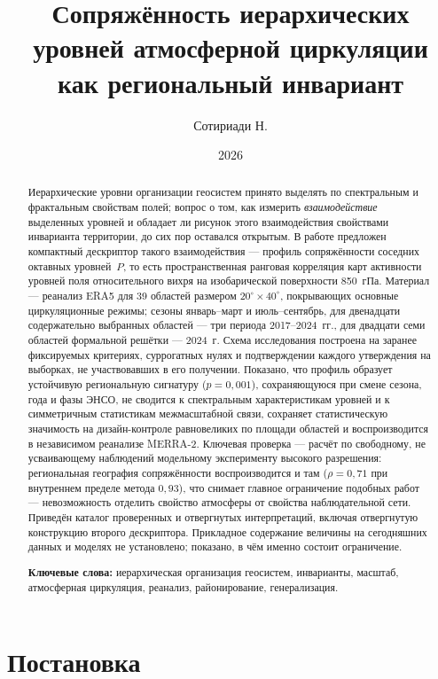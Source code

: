 \documentclass[11pt,a4paper]{article}
\title{Сопряжённость иерархических уровней атмосферной циркуляции\\
как региональный инвариант}
\author{Сотириади Н.}
\date{2026}
\begin{document}
\maketitle

\begin{abstract}
Иерархические уровни организации геосистем принято выделять по спектральным и фрактальным свойствам полей; вопрос о том, как измерить \emph{взаимодействие} выделенных уровней и обладает ли рисунок этого взаимодействия свойствами инварианта территории, до сих пор оставался открытым. В работе предложен компактный дескриптор такого взаимодействия --- профиль сопряжённости соседних октавных уровней~$P$, то есть пространственная ранговая корреляция карт активности уровней поля относительного вихря на изобарической поверхности 850~гПа. Материал --- реанализ ERA5 для 39 областей размером $20^\circ\times40^\circ$, покрывающих основные циркуляционные режимы; сезоны январь--март и июль--сентябрь, для двенадцати содержательно выбранных областей --- три периода 2017--2024~гг., для двадцати семи областей формальной решётки --- 2024~г. Схема исследования построена на заранее фиксируемых критериях, суррогатных нулях и подтверждении каждого утверждения на выборках, не участвовавших в его получении. Показано, что профиль образует устойчивую региональную сигнатуру ($p=0{,}001$), сохраняющуюся при смене сезона, года и фазы ЭНСО, не сводится к спектральным характеристикам уровней и к симметричным статистикам межмасштабной связи, сохраняет статистическую значимость на дизайн-контроле равновеликих по площади областей и воспроизводится в независимом реанализе MERRA-2. Ключевая проверка --- расчёт по свободному, не усваивающему наблюдений модельному эксперименту высокого разрешения: региональная география сопряжённости воспроизводится и там ($\rho=0{,}71$ при внутреннем пределе метода $0{,}93$), что снимает главное ограничение подобных работ --- невозможность отделить свойство атмосферы от свойства наблюдательной сети. Приведён каталог проверенных и отвергнутых интерпретаций, включая отвергнутую конструкцию второго дескриптора. Прикладное содержание величины на сегодняшних данных и моделях не установлено; показано, в чём именно состоит ограничение.

\smallskip
\noindent\textbf{Ключевые слова:} иерархическая организация геосистем, инварианты, масштаб, атмосферная циркуляция, реанализ, районирование, генерализация.
\end{abstract}

\section{Постановка}
\label{sec:intro}
\end{document}
